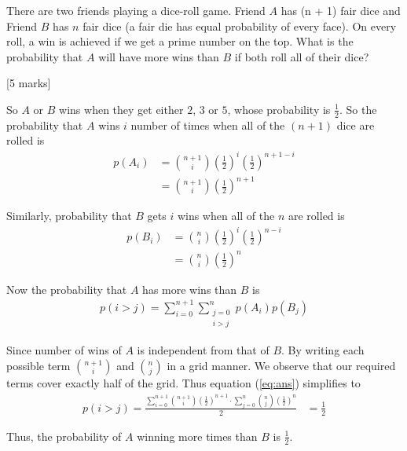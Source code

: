 \begin{que}
	There are two friends playing a dice-roll game. Friend $A$ has (n + 1)
	fair dice and Friend $B$ has $n$ fair dice (a fair die has equal
	probability of every face). On every roll, a win is achieved if we get
	a prime number on the top. What is the probability that $A$ will have
	more wins than $B$ if both roll all of their dice?

	\hspace*{\fill} [5 marks]
\end{que}
\begin{tcolorbox}
	\begin{sol}
		So $A$ or $B$ wins when they get either $2$, $3$ or $5$, whose
		probability is $\frac{1}{2}$. So the probability that $A$ wins
		$i$ number of times when all of the $(n+1)$ dice are rolled is
		\begin{align}
			p(A_i) & = \binom{n+1}{i} \left(\frac{1}{2}\right)^{i} \left(\frac{1}{2}\right)^{n+1-i} \\
			       & = \binom{n+1}{i} \left(\frac{1}{2}\right)^{n+1}
		\end{align}

		Similarly, probability that $B$ gets $i$ wins when all of the
		$n$ are rolled is
		\begin{align}
			p(B_i) & = \binom{n}{i} \left(\frac{1}{2}\right)^{i} \left(\frac{1}{2}\right)^{n-i} \\
			       & = \binom{n}{i} \left(\frac{1}{2}\right)^{n}
		\end{align}

		Now the probability that $A$ has more wins than $B$ is
		\begin{align}
			p(i>j) = \sum_{i=0}^{n+1}\sum_{\substack{j=0 \\ i>j}}^{n} p(A_i)p(B_j)
			\label{eq:ans}
		\end{align}

		Since number of wins of $A$ is independent from that of $B$. By
		writing each possible term $\binom{n+1}{i}$ and $\binom{n}{j}$
		in a grid manner. We observe that our required terms cover
		exactly half of the grid. Thus equation (\ref{eq:ans})
		simplifies to
		\begin{align}
			p(i>j) = \frac{\sum_{i=0}^{n+1}\binom{n+1}{i}\left(\frac{1}{2}\right)^{n+1}\cdot\sum_{j=0}^{n}\binom{n}{j}\left(\frac{1}{2}\right)^{n}}{2}
			 & = \frac{1}{2}
		\end{align}

		Thus, the probability of $A$ winning more times than $B$ is
		$\frac{1}{2}$.
	\end{sol}
\end{tcolorbox}
